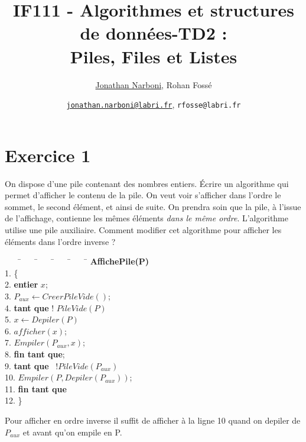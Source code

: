 \documentclass[10pt,a4paper]{article}
\title{IF111 - Algorithmes et structures de données-TD2 :\\ Piles, Files et Listes}
\date{}
\author{\underline{Jonathan Narboni}, Rohan Fossé}
\date{\underline{\texttt{jonathan.narboni@labri.fr}}, \texttt{rfosse@labri.fr}}
\begin{document}
\maketitle

\section*{Exercice 1}
On dispose d'une pile contenant des nombres entiers. Écrire un algorithme qui permet d'afficher le contenu de la pile. On veut voir s'afficher dans l'ordre le sommet, le second élément, et ainsi de suite. On prendra soin que la pile, à l'issue de l'affichage, contienne les mêmes éléments \emph{dans le même ordre}. L'algorithme utilise une pile auxiliaire. Comment modifier cet algorithme pour afficher les éléments dans l'ordre inverse ?


\begin{tcolorbox}
\begin{tabbing}
	~~~~\=~~~~\=~~~~\=~~~~\=~~~~\=\kill
	\>  \textbf{AffichePile(P)}\\
	 1.\> \{\\
	 2.\> \> \textbf{entier} $x$;\\
         3.\> \> $P_{aux} \leftarrow CreerPileVide()$;\\
         4.\> \> \textbf{tant que} ! $ PileVide(P)$\\
         5.\> \>  $x\leftarrow Depiler(P)$\\
         6.\> \>  $afficher(x)$;\\
         7.\> \>  $Empiler(P_{aux},x)$;\\
         8.\> \> \textbf{fin tant que};\\
         9.\> \> \textbf{tant que} \ $! PileVide(P_{aux})$\\
        10.\> \> $Empiler(P,Depiler(P_{aux}))$;\\
        11.\> \> \textbf{fin tant que}\\
	12.\>  \}
\end{tabbing}

Pour afficher en ordre inverse il suffit de afficher à la ligne 10 quand on depiler de $P_{aux}$ et avant qu'on empile en P.
\end{tcolorbox}
\end{document}
